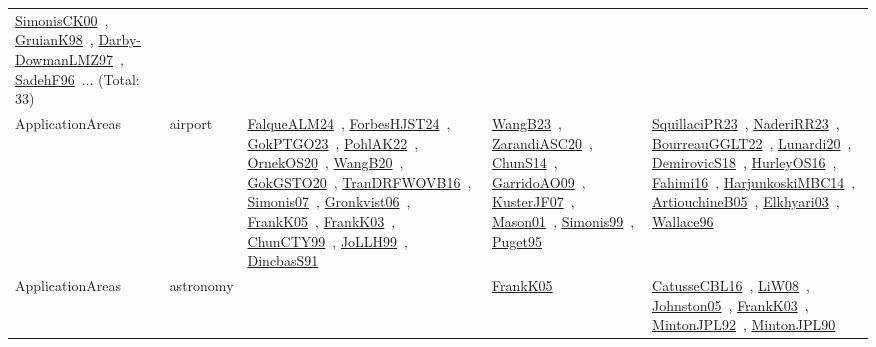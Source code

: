 {\begin{longtable}{lp{3cm}>{\raggedright\arraybackslash}p{6cm}>{\raggedright\arraybackslash}p{6cm}>{\raggedright\arraybackslash}p{8cm}}
\href{../works/SimonisCK00.pdf}{SimonisCK00}~\cite{SimonisCK00}, \href{../works/GruianK98.pdf}{GruianK98}~\cite{GruianK98}, \href{../works/Darby-DowmanLMZ97.pdf}{Darby-DowmanLMZ97}~\cite{Darby-DowmanLMZ97}, \href{../works/SadehF96.pdf}{SadehF96}~\cite{SadehF96}... (Total: 33)\\
\index{airport}\index{ApplicationAreas!airport}ApplicationAreas & airport & \href{../works/FalqueALM24.pdf}{FalqueALM24}~\cite{FalqueALM24}, \href{../works/ForbesHJST24.pdf}{ForbesHJST24}~\cite{ForbesHJST24}, \href{../works/GokPTGO23.pdf}{GokPTGO23}~\cite{GokPTGO23}, \href{../works/PohlAK22.pdf}{PohlAK22}~\cite{PohlAK22}, \href{../works/OrnekOS20.pdf}{OrnekOS20}~\cite{OrnekOS20}, \href{../works/WangB20.pdf}{WangB20}~\cite{WangB20}, \href{../works/GokGSTO20.pdf}{GokGSTO20}~\cite{GokGSTO20}, \href{../works/TranDRFWOVB16.pdf}{TranDRFWOVB16}~\cite{TranDRFWOVB16}, \href{../works/Simonis07.pdf}{Simonis07}~\cite{Simonis07}, \href{../works/Gronkvist06.pdf}{Gronkvist06}~\cite{Gronkvist06}, \href{../works/FrankK05.pdf}{FrankK05}~\cite{FrankK05}, \href{../works/FrankK03.pdf}{FrankK03}~\cite{FrankK03}, \href{../works/ChunCTY99.pdf}{ChunCTY99}~\cite{ChunCTY99}, \href{../works/JoLLH99.pdf}{JoLLH99}~\cite{JoLLH99}, \href{../works/DincbasS91.pdf}{DincbasS91}~\cite{DincbasS91} & \href{../works/WangB23.pdf}{WangB23}~\cite{WangB23}, \href{../works/ZarandiASC20.pdf}{ZarandiASC20}~\cite{ZarandiASC20}, \href{../works/ChunS14.pdf}{ChunS14}~\cite{ChunS14}, \href{../works/GarridoAO09.pdf}{GarridoAO09}~\cite{GarridoAO09}, \href{../works/KusterJF07.pdf}{KusterJF07}~\cite{KusterJF07}, \href{../works/Mason01.pdf}{Mason01}~\cite{Mason01}, \href{../works/Simonis99.pdf}{Simonis99}~\cite{Simonis99}, \href{../works/Puget95.pdf}{Puget95}~\cite{Puget95} & \href{../works/SquillaciPR23.pdf}{SquillaciPR23}~\cite{SquillaciPR23}, \href{../works/NaderiRR23.pdf}{NaderiRR23}~\cite{NaderiRR23}, \href{../works/BourreauGGLT22.pdf}{BourreauGGLT22}~\cite{BourreauGGLT22}, \href{../works/Lunardi20.pdf}{Lunardi20}~\cite{Lunardi20}, \href{../works/DemirovicS18.pdf}{DemirovicS18}~\cite{DemirovicS18}, \href{../works/HurleyOS16.pdf}{HurleyOS16}~\cite{HurleyOS16}, \href{../works/Fahimi16.pdf}{Fahimi16}~\cite{Fahimi16}, \href{../works/HarjunkoskiMBC14.pdf}{HarjunkoskiMBC14}~\cite{HarjunkoskiMBC14}, \href{../works/ArtiouchineB05.pdf}{ArtiouchineB05}~\cite{ArtiouchineB05}, \href{../works/Elkhyari03.pdf}{Elkhyari03}~\cite{Elkhyari03}, \href{../works/Wallace96.pdf}{Wallace96}~\cite{Wallace96}\\
\index{astronomy}\index{ApplicationAreas!astronomy}ApplicationAreas & astronomy &  & \href{../works/FrankK05.pdf}{FrankK05}~\cite{FrankK05} & \href{../works/CatusseCBL16.pdf}{CatusseCBL16}~\cite{CatusseCBL16}, \href{../works/LiW08.pdf}{LiW08}~\cite{LiW08}, \href{../works/Johnston05.pdf}{Johnston05}~\cite{Johnston05}, \href{../works/FrankK03.pdf}{FrankK03}~\cite{FrankK03}, \href{../works/MintonJPL92.pdf}{MintonJPL92}~\cite{MintonJPL92}, \href{../works/MintonJPL90.pdf}{MintonJPL90}~\cite{MintonJPL90}\\

\end{longtable}}
